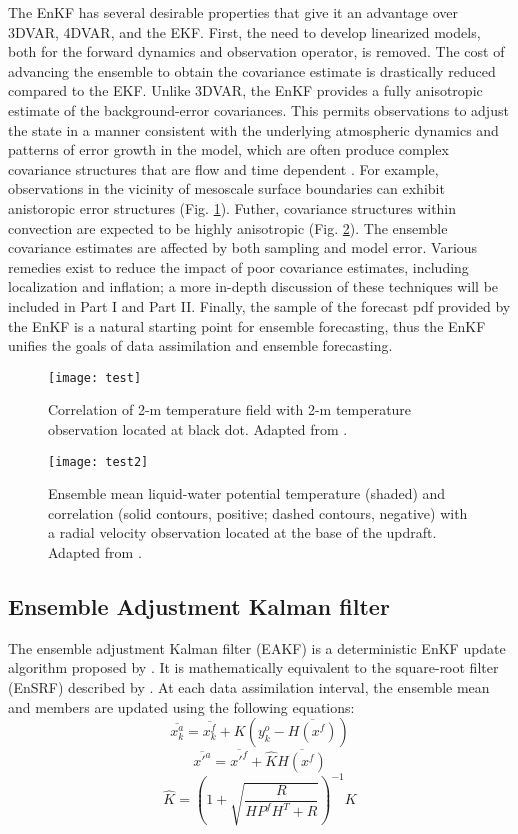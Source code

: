 The EnKF has several desirable properties that give it an advantage over 3DVAR, 4DVAR, and the EKF. First, the need to develop linearized models, both for the forward dynamics and observation operator, is removed. The cost of advancing the ensemble to obtain the covariance estimate is drastically reduced compared to the EKF. Unlike 3DVAR, the EnKF provides a fully anisotropic estimate of the background-error covariances. This permits observations to adjust the state in a manner consistent with the underlying atmospheric dynamics and patterns of error growth in the model, which are often produce complex covariance structures that are flow and time dependent \citep{bouttier94}. For example, observations in the vicinity of mesoscale surface boundaries can exhibit anistoropic error structures (Fig. \ref{cov1}). Futher, covariance structures within convection are expected to be highly anisotropic (Fig. \ref{cov2}). The ensemble covariance estimates are affected by both sampling and model error. Various remedies exist to reduce the impact of poor covariance estimates, including localization and inflation; a more in-depth discussion of these techniques will be included in Part I and Part II. Finally, the sample of the forecast pdf provided by the EnKF is a natural starting point for ensemble forecasting, thus the EnKF unifies the goals of data assimilation and ensemble forecasting.

\begin{figure}
\centering
\texttt{[image: test]}
\caption{Correlation of 2-m temperature field with 2-m temperature observation located at black dot. Adapted from \citet{knopfmeierstensrud13}. }
\label{cov1}
\end{figure}
\begin{figure}
\centering
\texttt{[image: test2]}
\caption{Ensemble mean liquid-water potential temperature (shaded) and correlation (solid contours, positive; dashed contours, negative) with a radial velocity observation located at the base of the updraft. Adapted from \citet{snyderzhang03}. }
\label{cov2}
\end{figure}

\subsection{Ensemble Adjustment Kalman filter}
\label{eakf}
The ensemble adjustment Kalman filter (EAKF) is a deterministic EnKF update algorithm proposed by \citet{anderson01}. It is mathematically equivalent to the square-root filter (EnSRF) described by \citet{whitakerhamill02}. At each data assimilation interval, the ensemble mean and members are updated using the following equations:
\begin{equation}
   \overline{x_k^a} = \overline{x_k^f} + K(y_k^o - \overline{H(x^f)})
\end{equation}
\begin{equation}
   \overline{x'^a} = \overline{x'^f} + \hat{K}\overline{H(x^f)}
\end{equation}
\begin{equation}
   \hat{K} = (1 + \sqrt{\frac{R}{HP^fH^T + R}})^{-1}K
\end{equation}

